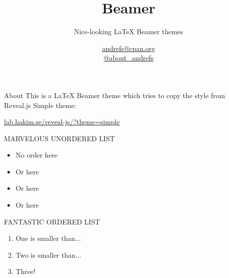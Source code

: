\documentclass[serif,14pt,color=usenames,dvipsnames]{beamer}
\title{Beamer}
\subtitle{Nice-looking LaTeX Beamer themes}
\author{\href{mailto:andrefs@cpan.org}{andrefs@cpan.org}\\\href{http://twitter.com/about\_andrefs}{@about\_andrefs}}
\institute{Institute, Location}
\begin{document}
\begin{frame}
\maketitle
\end{frame}

\begin{frame}{About}
This is a LaTeX Beamer theme which tries to copy the style from Reveal.js Simple theme: 

\url{lab.hakim.se/reveal-js/?theme=simple}
\end{frame}

\begin{frame}{MARVELOUS UNORDERED LIST}
\begin{itemize}
\item No order here
\item Or here
\item Or here
\item Or here
\end{itemize}
\end{frame}

\begin{frame}{FANTASTIC ORDERED LIST}
\begin{enumerate}
	\item One is smaller than...
	\item Two is smaller than...
	\item Three!
\end{enumerate}
\end{frame}
\end{document}
